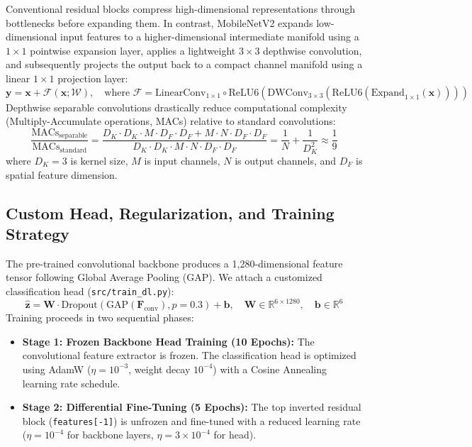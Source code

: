 \documentclass[11pt,a4paper]{article}
\begin{document}
Conventional residual blocks compress high-dimensional representations through bottlenecks before expanding them. In contrast, MobileNetV2 expands low-dimensional input features to a higher-dimensional intermediate manifold using a $1 \times 1$ pointwise expansion layer, applies a lightweight $3 \times 3$ depthwise convolution, and subsequently projects the output back to a compact channel manifold using a linear $1 \times 1$ projection layer:
\begin{equation}
    \mathbf{y} = \mathbf{x} + \mathcal{F}(\mathbf{x}; \mathcal{W}), \quad \text{where } \mathcal{F} = \text{LinearConv}_{1\times1} \circ \text{ReLU6}(\text{DWConv}_{3\times3}(\text{ReLU6}(\text{Expand}_{1\times1}(\mathbf{x}))))
\end{equation}
Depthwise separable convolutions drastically reduce computational complexity (Multiply-Accumulate operations, MACs) relative to standard convolutions:
\begin{equation}
    \frac{\text{MACs}_{\text{separable}}}{\text{MACs}_{\text{standard}}} = \frac{D_K \cdot D_K \cdot M \cdot D_F \cdot D_F + M \cdot N \cdot D_F \cdot D_F}{D_K \cdot D_K \cdot M \cdot N \cdot D_F \cdot D_F} = \frac{1}{N} + \frac{1}{D_K^2} \approx \frac{1}{9}
\end{equation}
where $D_K=3$ is kernel size, $M$ is input channels, $N$ is output channels, and $D_F$ is spatial feature dimension.

\subsection{Custom Head, Regularization, and Training Strategy}
The pre-trained convolutional backbone produces a 1,280-dimensional feature tensor following Global Average Pooling (GAP). We attach a customized classification head (\texttt{src/train\_dl.py}):
\begin{equation}
    \hat{\mathbf{z}} = \mathbf{W} \cdot \text{Dropout}(\text{GAP}(\mathbf{F}_{\text{conv}}), p=0.3) + \mathbf{b}, \quad \mathbf{W} \in \mathbb{R}^{6 \times 1280}, \quad \mathbf{b} \in \mathbb{R}^6
\end{equation}
Training proceeds in two sequential phases:
\begin{itemize}[leftmargin=*]
    \item \textbf{Stage 1: Frozen Backbone Head Training (10 Epochs):} The convolutional feature extractor is frozen. The classification head is optimized using AdamW ($\eta = 10^{-3}$, weight decay $10^{-4}$) with a Cosine Annealing learning rate schedule.
    \item \textbf{Stage 2: Differential Fine-Tuning (5 Epochs):} The top inverted residual block (\texttt{features[-1]}) is unfrozen and fine-tuned with a reduced learning rate ($\eta = 10^{-4}$ for backbone layers, $\eta = 3 \times 10^{-4}$ for head).
\end{itemize}
\end{document}
